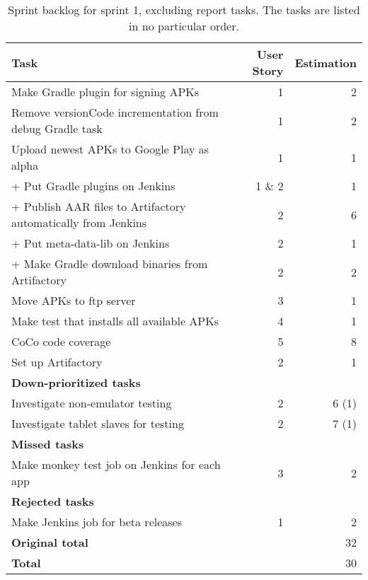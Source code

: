 \begin{table}[htp]%
  \centering
  \begin{tabular}{p{}rr}
    \toprule
    \textbf{Task} & \textbf{User Story} & \textbf{Estimation} \\
    \midrule
    Make Gradle plugin for signing APKs                            & 1      & 2 \\
    Remove versionCode incrementation from debug Gradle task       & 1      & 2 \\
    Upload newest APKs to Google Play as alpha                     & 1      & 1 \\
    + Put Gradle plugins on Jenkins                                & 1 \& 2 & 1 \\
    + Publish AAR files to Artifactory automatically from Jenkins  & 2      & 6 \\
    + Put meta-data-lib on Jenkins                                 & 2      & 1 \\
    + Make Gradle download binaries from Artifactory               & 2      & 2 \\
    Move APKs to ftp server                                        & 3      & 1 \\
    Make test that installs all available APKs                     & 4      & 1 \\
    CoCo code coverage                                             & 5      & 8 \\
    Set up Artifactory                                             & 2      & 1 \\
    \midrule
    \textbf{Down-prioritized tasks} & & \\
    \midrule
    Investigate non-emulator testing                               & 2      & 6 (1) \\
    Investigate tablet slaves for testing                          & 2      & 7 (1) \\
    \midrule
    \textbf{Missed tasks} & & \\
    \midrule
    Make monkey test job on Jenkins for each app                   & 3      & 2 \\
    \midrule
    \textbf{Rejected tasks} & & \\
    \midrule
    Make Jenkins job for beta releases                             & 1      & 2 \\
    \midrule
    \textbf{Original total} & & 32 \\
    \textbf{Total} & & 30 \\
    \bottomrule
  \end{tabular}
\caption{Sprint backlog for sprint 1, excluding report tasks. The tasks are listed in no particular order.}
\label{tab:sprint1_tasks}
\end{table}